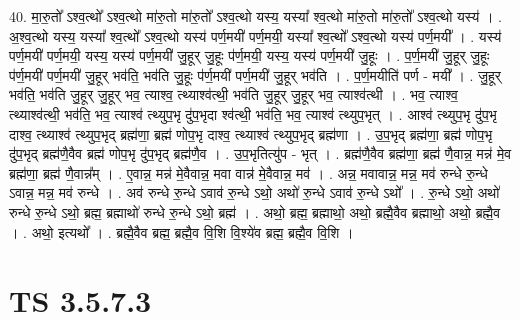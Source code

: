 \documentclass[17pt]{extarticle}
\begin{document}
40. मा॒रु॒तो᳚ ऽश्व॒त्थो᳚ ऽश्व॒त्थो मा॑रु॒तो मा॑रु॒तो᳚ ऽश्व॒त्थो यस्य॒ यस्या᳚ श्व॒त्थो मा॑रु॒तो मा॑रु॒तो᳚ ऽश्व॒त्थो यस्य॑ । . अ॒श्व॒त्थो यस्य॒ यस्या᳚ श्व॒त्थो᳚ ऽश्व॒त्थो यस्य॑ पर्ण॒मयी॑ पर्ण॒मयी॒ यस्या᳚ श्व॒त्थो᳚ ऽश्व॒त्थो यस्य॑ पर्ण॒मयी᳚ । . यस्य॑ पर्ण॒मयी॑ पर्ण॒मयी॒ यस्य॒ यस्य॑ पर्ण॒मयी॑ जु॒हूर् जु॒हूः प॑र्ण॒मयी॒ यस्य॒ यस्य॑ पर्ण॒मयी॑ जु॒हूः । . प॒र्ण॒मयी॑ जु॒हूर् जु॒हूः प॑र्ण॒मयी॑ पर्ण॒मयी॑ जु॒हूर् भव॑ति॒ भव॑ति जु॒हूः प॑र्ण॒मयी॑ पर्ण॒मयी॑ जु॒हूर् भव॑ति । . प॒र्ण॒मयीति॑ पर्ण - मयी᳚ । . जु॒हूर् भव॑ति॒ भव॑ति जु॒हूर् जु॒हूर् भव॒ त्याश्व॒ त्थ्याश्व॑त्थी॒ भव॑ति जु॒हूर् जु॒हूर् भव॒ त्याश्व॑त्थी । . भव॒ त्याश्व॒ त्थ्याश्व॑त्थी॒ भव॑ति॒ भव॒ त्याश्व॑ त्थ्युप॒भृ दु॑प॒भृदा श्व॑त्थी॒ भव॑ति॒ भव॒ त्याश्व॑ त्थ्युप॒भृत् । . आश्व॑ त्थ्युप॒भृ दु॑प॒भृ दाश्व॒ त्थ्याश्व॑ त्थ्युप॒भृद् ब्रह्म॑णा॒ ब्रह्म॑ णोप॒भृ दाश्व॒ त्थ्याश्व॑ त्थ्युप॒भृद् ब्रह्म॑णा । . उ॒प॒भृद् ब्रह्म॑णा॒ ब्रह्म॑ णोप॒भृ दु॑प॒भृद् ब्रह्म॑णै॒वैव ब्रह्म॑ णोप॒भृ दु॑प॒भृद् ब्रह्म॑णै॒व । . उ॒प॒भृतित्यु॑प - भृत् । . ब्रह्म॑णै॒वैव ब्रह्म॑णा॒ ब्रह्म॑ णै॒वान्न॒ मन्न॑ मे॒व ब्रह्म॑णा॒ ब्रह्म॑ णै॒वान्न᳚म् । . ए॒वान्न॒ मन्न॑ मे॒वैवान्न॒ मवा वान्न॑ मे॒वैवान्न॒ मव॑ । . अन्न॒ मवावान्न॒ मन्न॒ मव॑ रुन्धे रु॒न्धे ऽवान्न॒ मन्न॒ मव॑ रुन्धे । . अव॑ रुन्धे रु॒न्धे ऽवाव॑ रु॒न्धे ऽथो॒ अथो॑ रु॒न्धे ऽवाव॑ रु॒न्धे ऽथो᳚ । . रु॒न्धे ऽथो॒ अथो॑ रुन्धे रु॒न्धे ऽथो॒ ब्रह्म॒ ब्रह्माथो॑ रुन्धे रु॒न्धे ऽथो॒ ब्रह्म॑ । . अथो॒ ब्रह्म॒ ब्रह्माथो॒ अथो॒ ब्रह्मै॒वैव ब्रह्माथो॒ अथो॒ ब्रह्मै॒व । . अथो॒ इत्यथो᳚ । . ब्रह्मै॒वैव ब्रह्म॒ ब्रह्मै॒व वि॒शि वि॒श्ये॑व ब्रह्म॒ ब्रह्मै॒व वि॒शि । \newline
\pagebreak
{}

\section{ TS 3.5.7.3 }
\end{document}
